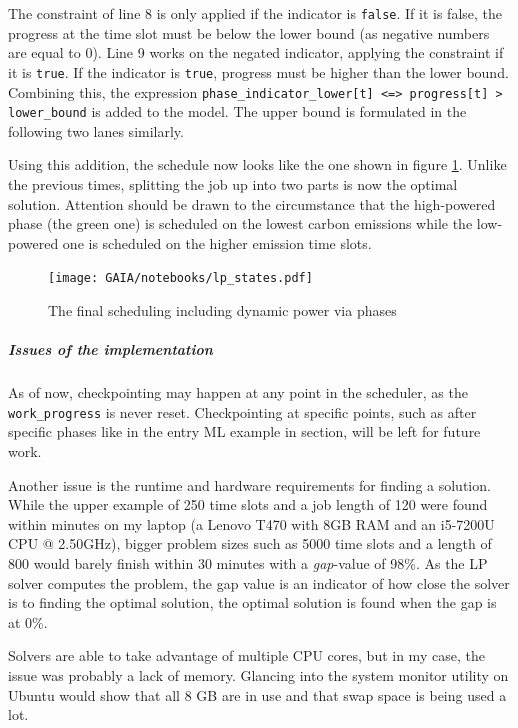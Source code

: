 The constraint of line 8 is only applied if the indicator is \verb|false|.
If it is false, the progress at the time slot must be below the lower bound (as negative numbers are equal to 0).
Line 9 works on the negated indicator, applying the constraint if it is \verb|true|. 
If the indicator is \verb|true|, progress must be higher than the lower bound. 
Combining this, the expression \verb|phase_indicator_lower[t] <=> progress[t] > lower_bound| is added to the model. 
The upper bound is formulated in the following two lanes similarly.

Using this addition, the schedule now looks like the one shown in figure \ref{fig:lp_states}. 
Unlike the previous times, splitting the job up into two parts is now the optimal solution. 
Attention should be drawn to the circumstance that the high-powered phase (the green one) is scheduled on the lowest carbon emissions while the low-powered one is scheduled on the higher emission time slots.

\begin{figure}
    \texttt{[image: GAIA/notebooks/lp\_states.pdf]}
    \caption{The final scheduling including dynamic power via phases}
    \label{fig:lp_states}
\end{figure}

\subparagraph{Issues of the implementation}

As of now, checkpointing may happen at any point in the scheduler, as the \verb|work_progress| is never reset. 
Checkpointing at specific points, such as after specific phases like in the entry ML example in section, will be left for future work.

Another issue is the runtime and hardware requirements for finding a solution.
While the upper example of 250 time slots and a job length of 120 were found within minutes on my laptop (a Lenovo T470 with 8GB RAM and an i5-7200U CPU @ 2.50GHz), bigger problem sizes such as 5000 time slots and a length of 800 would barely finish within 30 minutes with a \emph{gap}-value of 98\%.
As the LP solver computes the problem, the gap value is an indicator of how close the solver is to finding the optimal solution, the optimal solution is found when the gap is at 0\%.

Solvers are able to take advantage of multiple CPU cores, but in my case, the issue was probably a lack of memory. 
Glancing into the system monitor utility on Ubuntu would show that all 8 GB are in use and that swap space is being used a lot.

